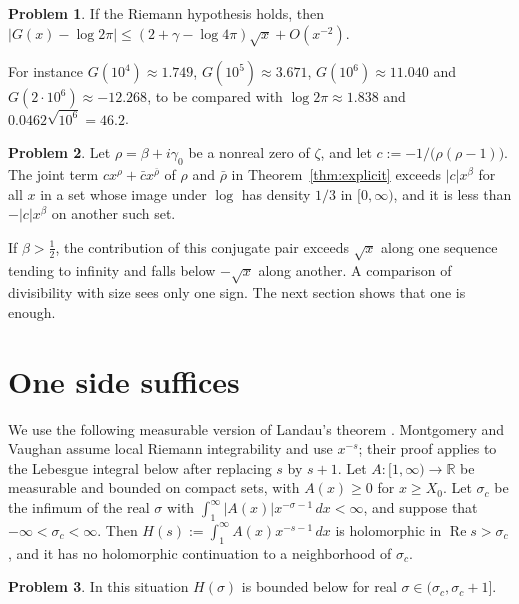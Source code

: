 \documentclass[reqno]{amsart}
\theoremstyle{definition}
\newtheorem{problem}{Problem}[section]
\theoremstyle{plain}
\newcommand{\R}{\mathbb{R}}
\renewcommand{\Re}{\operatorname{Re}}
\begin{document}
\begin{problem}\label{pr:rh-bound}
If the Riemann hypothesis holds, then $\lvert G(x) - \log 2\pi \rvert \le (2 + \gamma - \log 4\pi)\sqrt{x} + O(x^{-2})$.
\end{problem}

For instance $G(10^4) \approx 1.749$, $G(10^5) \approx 3.671$, $G(10^6) \approx 11.040$ and $G(2 \cdot 10^6) \approx -12.268$, to be compared with $\log 2\pi \approx 1.838$ and $0.0462 \sqrt{10^6} = 46.2$.

\begin{problem}\label{pr:one-pair}
Let $\rho = \beta + i\gamma_0$ be a nonreal zero of $\zeta$, and let $c := -1/\bigl(\rho(\rho-1)\bigr)$.  The joint term $c x^\rho + \bar c x^{\bar\rho}$ of $\rho$ and $\bar\rho$ in Theorem~\ref{thm:explicit} exceeds $\lvert c \rvert x^\beta$ for all $x$ in a set whose image under $\log$ has density $1/3$ in $[0, \infty)$, and it is less than $-\lvert c \rvert x^\beta$ on another such set.
\end{problem}

If $\beta > \frac12$, the contribution of this conjugate pair exceeds $\sqrt x$ along one sequence tending to infinity and falls below $-\sqrt x$ along another.  A comparison of divisibility with size sees only one sign.  The next section shows that one is enough.

\section{One side suffices}\label{sec:landau}

We use the following measurable version of Landau's theorem \cite{Lan}.  Montgomery and Vaughan \cite[Lemma~15.1]{MV} assume local Riemann integrability and use $x^{-s}$; their proof applies to the Lebesgue integral below after replacing $s$ by $s+1$.  Let $A \colon [1, \infty) \to \R$ be measurable and bounded on compact sets, with $A(x) \ge 0$ for $x \ge X_0$.  Let $\sigma_c$ be the infimum of the real $\sigma$ with $\int_1^\infty \lvert A(x) \rvert x^{-\sigma-1} \, d x < \infty$, and suppose that $-\infty < \sigma_c < \infty$.  Then $H(s) := \int_1^\infty A(x) x^{-s-1} \, d x$ is holomorphic in $\Re s > \sigma_c$, and it has no holomorphic continuation to a neighborhood of $\sigma_c$.

\begin{problem}\label{pr:below}
In this situation $H(\sigma)$ is bounded below for real $\sigma \in (\sigma_c, \sigma_c + 1]$.
\end{problem}
\end{document}
